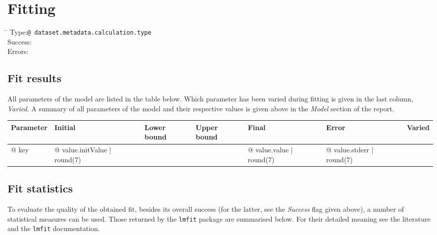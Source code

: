 \section{Fitting}

\begin{tabbing}
\hspace*{1.5cm}\=\kill
Type:\>\texttt{{@ dataset.metadata.calculation.type }}
\\
Success:\>%
\\
Errors:\>%
\end{tabbing}

\subsection{Fit results}

All parameters of the model are listed in the table below. Which parameter has been varied during fitting is given in the last column, \emph{Varied}. A summary of all parameters of the model and their respective values is given above in the \emph{Model} section of the report.

\vspace*{1ex}

\begin{tabular}{lllllll}
\toprule
\textbf{Parameter} & Initial & Lower bound & Upper bound & Final & Error & Varied
\\
\midrule
{@ key } & {@ value.initValue | round(7) }
& %
& %
& {@ value.value | round(7) } & {@ value.stderr | round(7) } & %
\\
\bottomrule
\end{tabular}


\subsection{Fit statistics}

To evaluate the quality of the obtained fit, besides its overall success (for the latter, see the \emph{Success} flag given above), a number of statistical measures can be used. Those returned by the \texttt{lmfit} package are summarised below. For their detailed meaning see the literature and the \texttt{lmfit} documentation.

